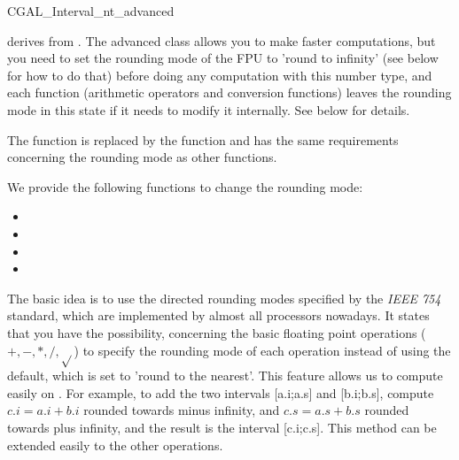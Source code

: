 \begin{ccAdvanced}
\samepage
\begin{ccClass} {CGAL_Interval_nt_advanced}
\label{interval-adv}

 derives from .
The advanced class allows you to make faster computations, but you need to set
the rounding mode of the FPU to 'round to infinity' (see below for how to do
that) before doing any computation with this number type, and each function
(arithmetic operators and conversion functions)
leaves the rounding mode in this state if it needs to modify it internally.
See below for details.


The function  is replaced by the
function  and has the same
requirements concerning the rounding mode as other functions.



We provide the following functions to change the rounding mode:
\begin{itemize}
\item {}
\item {}
\item {}
\item {}
\end{itemize}

\ccImplementation

The basic idea is to use the directed rounding modes specified by the 
{\it IEEE 754} standard, which are implemented by almost all processors 
nowadays.
It states that you have the possibility, concerning the basic floating point
operations ($+,-,*,/,\sqrt{}$) to specify the rounding mode of each operation
instead of using the default, which is set to 'round to the nearest'.
This feature allows us to compute easily on .  For example, to
add the two intervals [a.i;a.s] and [b.i;b.s], compute $c.i=a.i+b.i$ rounded
towards minus infinity, and $c.s=a.s+b.s$ rounded towards plus infinity, and
the result is the interval [c.i;c.s].  This method can be extended easily to
the other operations.


\end{ccClass}
\end{ccAdvanced}
